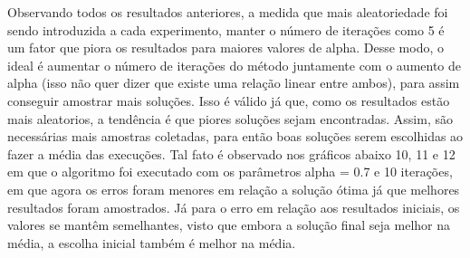 \documentclass[10pt]{extarticle} %
\begin{document}
Observando todos os resultados anteriores, a medida que mais aleatoriedade foi sendo introduzida a cada experimento, manter o número de iterações como 5 é um fator que piora os resultados para maiores valores de alpha. Desse modo, o ideal é aumentar o número de iterações do método juntamente com o aumento de alpha (isso não quer dizer que existe uma relação linear entre ambos), para assim conseguir amostrar mais soluções. Isso é válido já que, como os resultados estão mais aleatorios, a tendência é que piores soluções sejam encontradas. Assim, são necessárias mais amostras coletadas, para então boas soluções serem escolhidas ao fazer a média das execuções. Tal fato é observado nos gráficos abaixo 10, 11 e 12 em que o algoritmo foi executado com os parâmetros alpha = 0.7 e 10 iterações, em que agora os erros foram menores em relação a solução ótima já que melhores resultados foram amostrados. Já para o erro em relação aos resultados iniciais, os valores se mantêm semelhantes, visto que embora a solução final seja melhor na média, a escolha inicial também é melhor na média.
\end{document}
